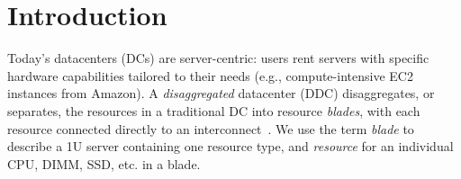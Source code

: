 
\section{Introduction} 
\label{sec:intro}
Today's datacenters (DCs) are server-centric: users rent servers with
specific hardware capabilities tailored to their needs (e.g.,
compute-intensive EC2 instances from Amazon). 
A \emph{disaggregated} datacenter (DDC) disaggregates, or separates,
the resources in a traditional DC into resource \emph{blades},
with each resource connected directly to an interconnect~\cite{Han2013,Gao2016}. 
We use the term \emph{blade} to describe a 1U server containing one resource
type, and \emph{resource} for an individual CPU, DIMM, SSD, etc. in a blade. 






